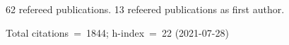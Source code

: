 62 refereed publications. 13 refeered publications as first author.

Total citations~=~1844; h-index~=~22 (2021-07-28)